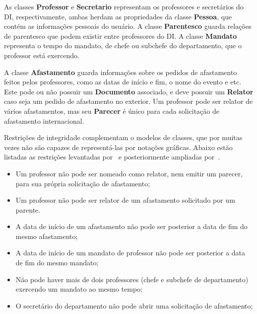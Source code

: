 As classes \textbf{Professor} e \textbf{Secretario} representam os professores
e secretários do DI, respectivamente, ambas herdam as propriedades da classe \textbf{Pessoa},
que contém as informações pessoais do usuário. A classe \textbf{Parentesco} 
guarda relações de parentesco que podem existir entre professores do DI.
A classe \textbf{Mandato} representa o tempo do mandato, de chefe ou subchefe do departamento,
que o professor está exercendo.

A classe \textbf{Afastamento} guarda informações sobre os pedidos de afastamento
feitos pelos professores, como as datas de início e fim, o nome do evento e etc.
Este pode ou não possuir um \textbf{Documento} associado, e deve possuir um \textbf{Relator}
caso seja um pedido de afastamento no exterior. Um professor pode ser relator de vários afastamentos,
mas seu \textbf{Parecer} é único para cada solicitação de afastamento internacional.


Restrições de integridade complementam o modelos de classes, que por muitas vezes não são
capazes de representá-las por notações gráficas. Abaixo estão listadas as restrições
levantadas por~ e posteriormente ampliadas por~.

\begin{itemize}
    \item Um professor não pode ser nomeado como relator, nem emitir um parecer, para sua própria solicitação de afastamento;
    \item Um professor não pode ser relator de um afastamento solicitado por um parente.
    \item A data de início de um afastamento não pode ser posterior a data de fim do mesmo afastamento;
    \item A data de início de um mandato de professor não pode ser posterior a data de fim do mesmo mandato;
    \item Não pode haver mais de dois professores (chefe e subchefe de departamento) exercendo um mandato ao mesmo tempo;
    \item O secretário do departamento não pode abrir uma solicitação de afastamento;
    
\end{itemize}